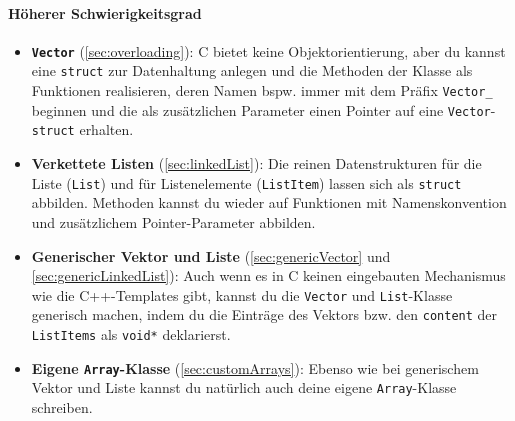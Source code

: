 \paragraph{Höherer Schwierigkeitsgrad}
\begin{itemize}
\item
\textbf{\lstinline|Vector|} (\ref{sec:overloading}): C bietet keine Objektorientierung, aber du kannst eine \lstinline|struct| zur Datenhaltung anlegen und die Methoden der Klasse als Funktionen realisieren, deren Namen bspw. immer mit dem Präfix \lstinline|Vector_| beginnen und die als zusätzlichen Parameter einen Pointer auf eine \lstinline|Vector|-\lstinline|struct| erhalten.

\item 
\textbf{Verkettete Listen} (\ref{sec:linkedList}):
Die reinen Datenstrukturen für die Liste (\lstinline|List|) und für Listenelemente (\lstinline|ListItem|) lassen sich als \lstinline|struct| abbilden.
Methoden kannst du wieder auf Funktionen mit Namenskonvention und zusätzlichem Pointer-Parameter abbilden.

\item
\textbf{Generischer Vektor und Liste} (\ref{sec:genericVector} und \ref{sec:genericLinkedList}):
Auch wenn es in C keinen eingebauten Mechanismus wie die C++-Templates gibt, kannst du die \lstinline|Vector| und \lstinline|List|-Klasse generisch machen, indem du die Einträge des Vektors bzw. den \lstinline|content| der \lstinline|ListItems| als \lstinline|void*| deklarierst.

\item
\textbf{Eigene \lstinline|Array|-Klasse} (\ref{sec:customArrays}):
Ebenso wie bei generischem Vektor und Liste kannst du natürlich auch deine eigene \lstinline|Array|-Klasse schreiben.
\end{itemize}
